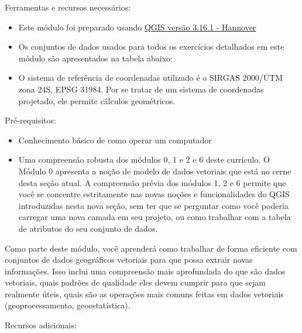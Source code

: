 \documentclass[
]{krantz}
\providecommand{\tightlist}{%
  \setlength{\itemsep}{0pt}\setlength{\parskip}{0pt}}
\begin{document}
Ferramentas e recursos necessários:

\begin{itemize}
\tightlist
\item
  Este módulo foi preparado usando \href{https://qgis.org/en/site/forusers/download.html}{QGIS versão 3.16.1 - Hannover}
\item
  Os conjuntos de dados usados \hspace{0pt}\hspace{0pt}para todos os exercícios detalhados em este módulo são apresentados na tabela abaixo:
\item
  O sistema de referência de coordenadas utilizado é o SIRGAS 2000/UTM zona 24S, EPSG 31984. Por se tratar de um sistema de coordenadas projetado, ele permite cálculos geométricos.
\end{itemize}

Pré-requisitos:

\begin{itemize}
\tightlist
\item
  Conhecimento básico de como operar um computador
\item
  Uma compreensão robusta dos módulos 0, 1 e 2 e 6 deste currículo. O Módulo 0 apresenta a noção de modelo de dados vetoriais que está no cerne desta seção atual. A compreensão prévia dos módulos 1, 2 e 6 permite que você se concentre estritamente nas novas noções e funcionalidades do QGIS introduzidas nesta nova seção, sem ter que se perguntar como você poderia carregar uma nova camada em seu projeto, ou como trabalhar com a tabela de atributos do seu conjunto de dados.
\end{itemize}

Como parte deste módulo, você aprenderá como trabalhar de forma eficiente com conjuntos de dados geográficos vetoriais para que possa extrair novas informações. Isso inclui uma compreensão mais aprofundada do que são dados vetoriais, quais padrões de qualidade eles devem cumprir para que sejam realmente úteis, quais são as operações mais comuns feitas em dados vetoriais (geoprocessamento, geoestatística).

Recursos adicionais:
\end{document}
